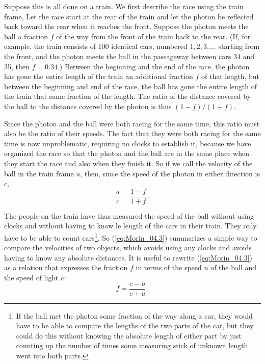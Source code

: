 Suppose this is all done on a train. We first describe the race using the train frame, Let the race start at the rear of the train and let the photon be reflected back toward the rear when it reaches the front. Suppose the photon meets the ball a fraction $f$ of the way from the front of the train back to the rear. (If, for example, the train consists of 100 identical cars, numbered $1,2,3,\ldots$ starting from the front, and the photon meets the ball in the passageway between cars 34 and 35, then $f = 0.34$.) Between the beginning and the end of the race, the photon has gone the entire length of the train  an additional fraction $f$ of that length, but between the beginning and end of the race, the ball has gone the entire length of the train  that same fraction of the length. The ratio of the distance covered by the ball to the distance covered by the photon is thus $(1 - f)/(1 + f)$.

Since the photon and the ball were both racing for the same time, this ratio must also be the ratio of their speeds. The fact that they were both racing for the same time is now unproblematic, requiring no clocks to establish it, because we have organized the race so that the photon and the ball are in the same place when they start the race and also when they finish it. So if we call the velocity of the ball in the train frame $u$, then, since the speed of the photon in either direction is $c$, 
\begin{equation}\label{eq:Morin_04.3}
\frac{u}{c} = \frac{1 - f}{1 + f}\,.
\end{equation}

The people on the train have thus measured the speed of the ball without using clocks and without having to know le length of the cars in their train. They only have to be able to count cars\footnote{If the ball met the photon some fraction of the way along a car, they would have to be able to compare the lengths of the two parts of the car, but they could do this without knowing the absolute length of either part by just counting up the number of times some measuring stick of unknown length went into both parts.}. So (\ref{eq:Morin_04.3}) summarizes a simple way to compare the velocities of two objects, which avoids using any clocks and avoids having to know any absolute distances. It is useful to rewrite (\ref{eq:Morin_04.3}) as a relation that expresses the fraction $f$ in terms of the speed $u$ of the ball and the speed of light $c\,$:
\begin{equation}\label{eq:Morin_04.4}
f = \frac{c - u}{c + u}\,.
\end{equation}

